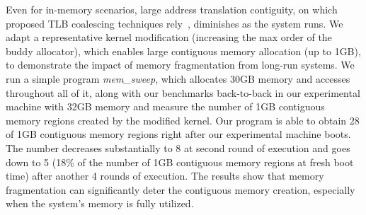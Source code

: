 Even for in-memory scenarios, large address translation contiguity, on which proposed
TLB coalescing techniques rely~\cite{haria:devirtualizing,karakostas:redundant,gantz:hybrid,pham:colt,pham:increasing}, diminishes as the system runs. We adapt a representative kernel modification (increasing the max order of the buddy allocator), which enables large contiguous memory allocation (up to 1GB), to demonstrate the impact of memory fragmentation from long-run systems. We run a simple program \textit{mem\_sweep}, which allocates 30GB memory and accesses throughout all of it, along with our benchmarks back-to-back in our experimental machine with 32GB memory and measure the number of 1GB contiguous memory regions created by the modified kernel. Our program is able to obtain 28 of 1GB contiguous memory regions right after our experimental machine boots. The number decreases substantially to 8 at second round of execution and goes down to 5 (18\% of the number of 1GB contiguous memory regions at fresh boot time) after another 4 rounds of execution. The results show that memory fragmentation can significantly deter the contiguous memory creation, especially when the system's memory is fully utilized.